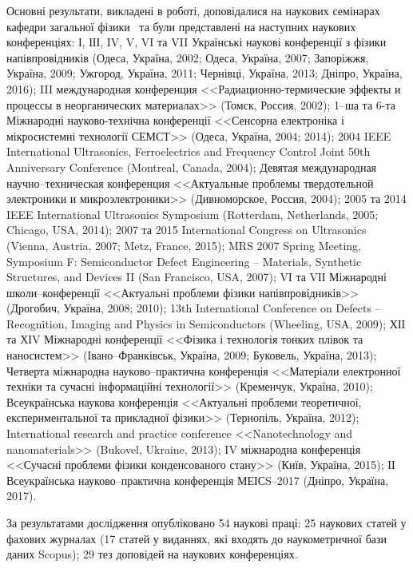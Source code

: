 {\probationTXT}
Основні результати, викладені в роботі, доповідалися на наукових семінарах
кафедри загальної фізики \thesisOfOrganization
~та були представлені на наступних наукових конференціях:
І, ІІІ, IV, V, VI та VII Українські наукові конференції з фізики напівпровідників
(Одеса, Україна, 2002; Одеса, Україна, 2007; Запоріжжя, Україна, 2009;
Ужгород, Україна, 2011; Чернівці, Україна, 2013; Дніпро, Україна, 2016);
III международная конференция <<Радиационно-термические эффекты и процессы в неорганических материалах>> (Томск, Россия, 2002);
1--ша та 6-та Міжнародні науково-технічна конференції <<Сенсорна електроніка і мікросистемні технології СЕМСТ>> (Одеса, Україна, 2004; 2014);
2004 IEEE International Ultrasonics, Ferroelectrics and Frequency Control Joint 50th Anniversary Conference (Montreal, Canada, 2004);
Девятая международная научно--техническая конференция <<Актуальные проблемы твердотельной электроники и микроэлектроники>> (Дивноморское, Россия, 2004);
2005 та 2014 IEEE International Ultrasonics Symposium (Rotterdam, Netherlands, 2005; Chicago, USA, 2014);
2007 та 2015 International Congress on Ultrasonics (Vienna, Austria, 2007; Metz, France, 2015);
MRS 2007 Spring Meeting, Symposium F: Semiconductor Defect Engineering -- Materials, Synthetic Structures, and Devices II (San Francisco, USA, 2007);
VІ та VІІ Міжнародні школи--конференції <<Актуальні проблеми фізики напівпровідників>> (Дрогобич, Україна, 2008; 2010);
13th International Conference on Defects – Recognition, Imaging and Physics in Semiconductors (Wheeling, USA, 2009);
ХІІ та ХІV Міжнародні конференції <<Фізика і технологія тонких плівок та наносистем>> (Івано--Франківськ, Україна, 2009; Буковель, Україна, 2013);
Четверта міжнародна науково--практична конференція <<Матеріали електронної техніки та сучасні інформаційні технології>> (Кременчук, Україна, 2010);
Всеукраїнська наукова конференція <<Актуальні проблеми теоретичної, експериментальної та прикладної фізики>> (Тернопіль, Україна, 2012);
International research and practice conference <<Nanotechnology and nanomaterials>> (Bukovel, Ukraine, 2013);
IV міжнародна конференція <<Сучасні проблеми фізики конденсованого стану>> (Київ, Україна, 2015);
ІІ Всеукраїнська науково--практична конференція МЕІСS--2017 (Дніпро, Україна, 2017).

{\publicationsTXT}
За результатами дослідження опубліковано 54 наукові праці:
 25 наукових статей
 у фахових журналах (17 статей у виданнях, які входять до наукометричної бази даних Scopus); 29 тез доповідей на наукових конференціях.


